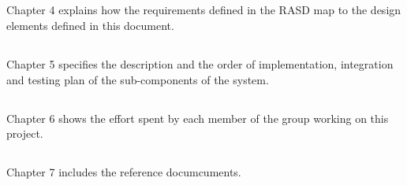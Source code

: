         \subsection*{}
        Chapter 4 explains how the requirements defined in the RASD map to the
        design elements defined in this document.

        \subsection*{}
        Chapter 5 specifies the description and the order of implementation,
        integration and testing plan of the sub-components of the system.
        
        \subsection*{}
        Chapter 6 shows the effort spent by each member of the group working on
        this project.
    
        \subsection*{}
        Chapter 7 includes the reference documcuments.
        